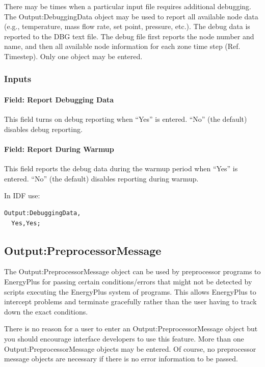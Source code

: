 There may be times when a particular input file requires additional debugging. The Output:DebuggingData object may be used to report all available node data (e.g., temperature, mass flow rate, set point, pressure, etc.). The debug data is reported to the DBG text file. The debug file first reports the node number and name, and then all available node information for each zone time step (Ref. Timestep). Only one object may be entered.

\subsubsection{Inputs}\label{inputs-12-017}

\paragraph{Field: Report Debugging Data}\label{field-report-debugging-data}

This field turns on debug reporting when ``Yes'' is entered. ``No'' (the default) disables debug reporting.

\paragraph{Field: Report During Warmup}\label{field-report-during-warmup}

This field reports the debug data during the warmup period when ``Yes'' is entered. ``No'' (the default) disables reporting during warmup.

In IDF use:

\begin{lstlisting}
Output:DebuggingData,
  Yes,Yes;
\end{lstlisting}

\subsection{Output:PreprocessorMessage}\label{outputpreprocessormessage}

The Output:PreprocessorMessage object can be used by preprocessor programs to EnergyPlus for passing certain conditions/errors that might not be detected by scripts executing the EnergyPlus system of programs. This allows EnergyPlus to intercept problems and terminate gracefully rather than the user having to track down the exact conditions.

There is no reason for a user to enter an Output:PreprocessorMessage object but you should encourage interface developers to use this feature. More than one Output:PreprocessorMessage objects may be entered. Of course, no preprocessor message objects are necessary if there is no error information to be passed.

